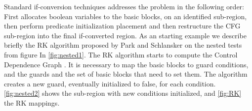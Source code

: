 Standard if-conversion techniques addresses the problem in the following order: First allocates boolean variables to the basic blocks, on an identified sub-region, then perform predicate initialization placement and then restructure the CFG sub-region into the final if-converted region. 
As an starting example we describe briefly the RK algorithm proposed by Park and Schlansker \cite{Schlansker-predicated} on the nested tests from figure In \ref{fig:nested1}. 
The RK algorithm starts to compute the Control Dependence Graph \cite{Ferrante:1987:PDG:24039.24041}. It is necessary to map the basic blocks to guard conditions, and the guards and the set of basic blocks that need to set them. The algorithm creates a new guard, eventually initialized to false, for each condition. \ref{fig:nested2} shows the sub-region with new conditions initialized, and \ref{fig:RK} the RK mappings.

